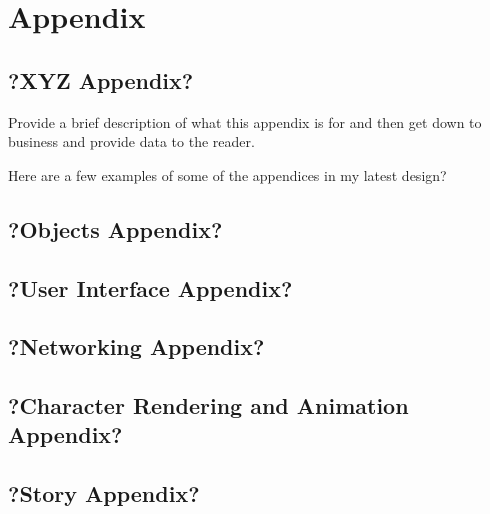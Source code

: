 \documentclass[a4paper]{report}
\begin{document}
\chapter{Appendix}

	\section{?XYZ Appendix?}

		Provide a brief description of what this appendix is for and then get down to business and provide data to the reader.

		Here are a few examples of some of the appendices in my latest design?

	\section{?Objects Appendix?}

	\section{?User Interface Appendix?}

	\section{?Networking Appendix?}

	\section{?Character Rendering and Animation Appendix?}

	\section{?Story Appendix?}
\end{document}
